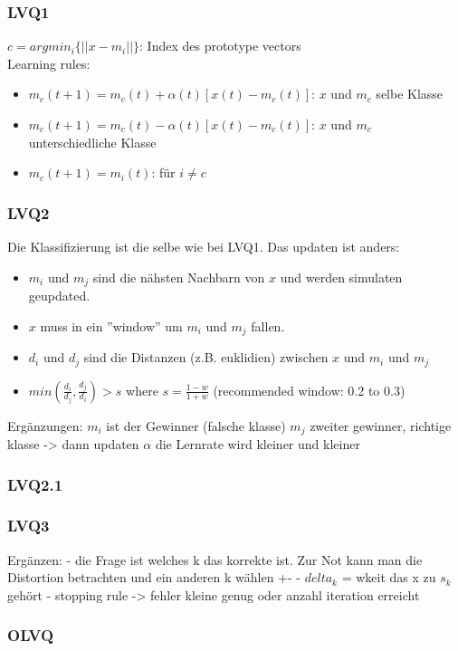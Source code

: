 \subsubsection{LVQ1}
\label{sssect:vq-lvq1}
$c = argmin_i\{||x - m_i||\}$: Index des prototype vectors\\
Learning rules:
\begin{itemize}
	\item $m_c(t + 1) = m_c(t) + \alpha(t)[x(t) - m_c(t)]$: $x$ und $m_c$ selbe Klasse
	\item $m_c(t + 1) = m_c(t) - \alpha(t)[x(t) - m_c(t)]$: $x$ und $m_c$ unterschiedliche Klasse
	\item $m_c(t + 1) = m_i(t)$: für $i \neq c$
\end{itemize}

\subsubsection{LVQ2}
\label{sssect:vq-lvq2}
Die Klassifizierung ist die selbe wie bei LVQ1. Das updaten ist anders:
\begin{itemize}
	\item $m_i$ und $m_j$ sind die nähsten Nachbarn von $x$ und werden simulaten geupdated.
	\item $x$ muss in ein ''window'' um $m_i$ und $m_j$ fallen.
	\item $d_i$ und $d_j$ sind die Distanzen (z.B. euklidien) zwischen $x$ und $m_i$ und $m_j$
	\item $min \left(\frac{d_i}{d_j}, \frac{d_j}{d_i}\right) > s$ where $s = \frac{1 - w}{1 + w}$ (recommended window: 0.2 to 0.3)
\end{itemize}


Ergänzungen:
$m_i$ ist der Gewinner (falsche klasse)
$m_j$ zweiter gewinner, richtige klasse -> dann updaten
$\alpha$ die Lernrate wird kleiner und kleiner

\subsubsection{LVQ2.1}
\label{sssect:vq-lvq2.1}


\subsubsection{LVQ3}
\label{sssect:vq-lvq3}



Ergänzen:
- die Frage ist welches k das korrekte ist. Zur Not kann man die Distortion betrachten und ein anderen k wählen +-
- $delta_k$ = wkeit das x zu $s_k$ gehört
- stopping rule -> fehler kleine genug oder anzahl iteration erreicht
\subsubsection{OLVQ}
\label{sssect:vq-olvq}